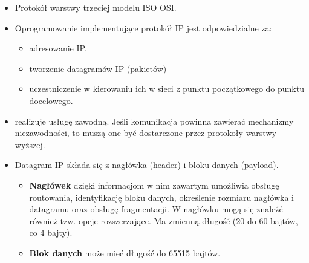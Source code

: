\documentclass[../main.tex]{subfiles}
\begin{document}
    \begin{itemize}
        \item Protokół warstwy trzeciej modelu ISO OSI.
        \item Oprogramowanie implementujące protokół IP jest odpowiedzialne za:
        \begin{itemize}
            \item adresowanie IP,
            \item tworzenie datagramów IP (pakietów)
            \item uczestniczenie w kierowaniu ich w sieci z punktu początkowego do punktu docelowego.
        \end{itemize}
        \item realizuje usługę zawodną. Jeśli komunikacja powinna zawierać mechanizmy niezawodności, to muszą one być dostarczone przez protokoły warstwy wyższej.
        \item Datagram IP składa się z nagłówka (header) i bloku danych (payload).
        \begin{itemize}
            \item \textbf{Nagłówek} dzięki informacjom w nim zawartym umożliwia obsługę routowania, identyfikację bloku danych, określenie rozmiaru nagłówka i datagramu oraz obsługę fragmentacji. W nagłówku mogą się znaleźć również tzw. opcje rozszerzające. Ma zmienną długość (20 do 60 bajtów, co 4 bajty).
            \item \textbf{Blok danych} może mieć długość do 65515 bajtów.
        \end{itemize}
    \end{itemize}
\end{document}
